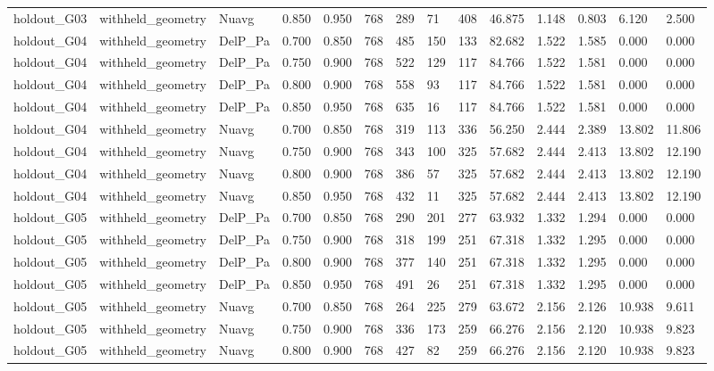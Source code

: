 \begin{tabular}{llllllllllllll}
holdout_G03 & withheld_geometry & Nuavg & 0.850 & 0.950 & 768 & 289 & 71 & 408 & 46.875 & 1.148 & 0.803 & 6.120 & 2.500 \\
holdout_G04 & withheld_geometry & DelP_Pa & 0.700 & 0.850 & 768 & 485 & 150 & 133 & 82.682 & 1.522 & 1.585 & 0.000 & 0.000 \\
holdout_G04 & withheld_geometry & DelP_Pa & 0.750 & 0.900 & 768 & 522 & 129 & 117 & 84.766 & 1.522 & 1.581 & 0.000 & 0.000 \\
holdout_G04 & withheld_geometry & DelP_Pa & 0.800 & 0.900 & 768 & 558 & 93 & 117 & 84.766 & 1.522 & 1.581 & 0.000 & 0.000 \\
holdout_G04 & withheld_geometry & DelP_Pa & 0.850 & 0.950 & 768 & 635 & 16 & 117 & 84.766 & 1.522 & 1.581 & 0.000 & 0.000 \\
holdout_G04 & withheld_geometry & Nuavg & 0.700 & 0.850 & 768 & 319 & 113 & 336 & 56.250 & 2.444 & 2.389 & 13.802 & 11.806 \\
holdout_G04 & withheld_geometry & Nuavg & 0.750 & 0.900 & 768 & 343 & 100 & 325 & 57.682 & 2.444 & 2.413 & 13.802 & 12.190 \\
holdout_G04 & withheld_geometry & Nuavg & 0.800 & 0.900 & 768 & 386 & 57 & 325 & 57.682 & 2.444 & 2.413 & 13.802 & 12.190 \\
holdout_G04 & withheld_geometry & Nuavg & 0.850 & 0.950 & 768 & 432 & 11 & 325 & 57.682 & 2.444 & 2.413 & 13.802 & 12.190 \\
holdout_G05 & withheld_geometry & DelP_Pa & 0.700 & 0.850 & 768 & 290 & 201 & 277 & 63.932 & 1.332 & 1.294 & 0.000 & 0.000 \\
holdout_G05 & withheld_geometry & DelP_Pa & 0.750 & 0.900 & 768 & 318 & 199 & 251 & 67.318 & 1.332 & 1.295 & 0.000 & 0.000 \\
holdout_G05 & withheld_geometry & DelP_Pa & 0.800 & 0.900 & 768 & 377 & 140 & 251 & 67.318 & 1.332 & 1.295 & 0.000 & 0.000 \\
holdout_G05 & withheld_geometry & DelP_Pa & 0.850 & 0.950 & 768 & 491 & 26 & 251 & 67.318 & 1.332 & 1.295 & 0.000 & 0.000 \\
holdout_G05 & withheld_geometry & Nuavg & 0.700 & 0.850 & 768 & 264 & 225 & 279 & 63.672 & 2.156 & 2.126 & 10.938 & 9.611 \\
holdout_G05 & withheld_geometry & Nuavg & 0.750 & 0.900 & 768 & 336 & 173 & 259 & 66.276 & 2.156 & 2.120 & 10.938 & 9.823 \\
holdout_G05 & withheld_geometry & Nuavg & 0.800 & 0.900 & 768 & 427 & 82 & 259 & 66.276 & 2.156 & 2.120 & 10.938 & 9.823 \\

\end{tabular}
